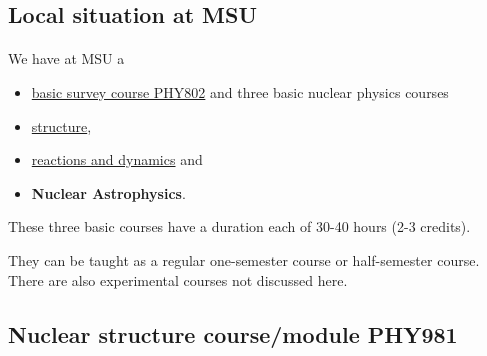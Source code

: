 \documentclass[%
twoside,                 %
final,                   %
10pt]{article}
\begin{document}
\noindent




\subsection*{Local situation at MSU}

\paragraph{}

We have at MSU a  
\begin{itemize}
\item \href{{https://people.nscl.msu.edu/~witek/Classes/PHY802/NuclPhys802-2015.html}}{basic survey course PHY802}  and three basic nuclear physics courses 

\item \href{{http://nuclearstructure.github.io/PHY981/doc/web/course.html}}{structure}, 

\item \href{{https://people.nscl.msu.edu/~nunes/phy982/phy982web2015.htm}}{reactions and dynamics}  and 

\item \textbf{Nuclear Astrophysics}. 
\end{itemize}

\noindent
These three basic courses have a duration each  of 30-40 hours (2-3 credits).   

They can be taught as a regular one-semester course or half-semester course. There are also experimental courses not discussed here.







\subsection*{Nuclear structure course/module  PHY981}

\end{document}
